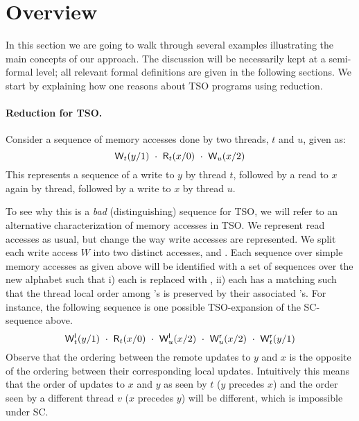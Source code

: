 \documentclass[preprint,9pt]{sigplanconf}
\begin{document}
\newcommand{\alitrue}{\ensuremath{\mathit{true}}}
\newcommand{\alifalse}{\ensuremath{\mathit{false}}}



\section{Overview}
In this section we are going to walk through several examples illustrating the main concepts of our approach.
The discussion will be necessarily kept at a semi-formal level; all relevant formal definitions are given in the following sections.
We start by explaining how one reasons about TSO programs using reduction.

\paragraph{Reduction for TSO.}
Consider a sequence of memory accesses done by two threads, $t$ and $u$, given as:
\[
{\aliwritex t y 1}\ \cdot\ {\alireadx t x 0}\ \cdot\ {\aliwritex u x 2}
\]
This represents a sequence of a write to $y$ by thread $t$, followed by a read to $x$ again by thread, followed by a write to $x$ by thread $u$.

To see why this is a {\em bad} (distinguishing) sequence for TSO, we will refer to an alternative characterization of memory accesses in TSO.
We represent read accesses as usual, but change the way write accesses are represented.
We split each write access $W$ into two distinct accesses, {\locwrite} and {\remwrite}.
Each sequence over simple memory accesses as given above will be identified with a set of sequences over the new alphabet such that i) each {\aliwrite} is replaced with {\locwrite}, ii) each {\locwrite} has a matching {\remwrite} such that the thread local order among {\locwrite}'s is preserved by their associated {\remwrite}'s.
For instance, the following sequence is one possible TSO-expansion of the SC-sequence above.
\[
{\locwritex t y 1}\ \cdot\ {\alireadx t x 0}\ \cdot\ {\locwritex u x 2}\ \cdot\ {\remwritex u x 2}\ \cdot\ {\remwritex t y 1}
\]
Observe that the ordering between the remote updates to $y$ and $x$ is the opposite of the ordering between their corresponding local updates. 
Intuitively this means that the order of updates to $x$ and $y$ as seen by $t$ ($y$ precedes $x$) and the order seen by a different thread $v$ ($x$ precedes $y$) will be different, which is impossible under SC.
\end{document}
